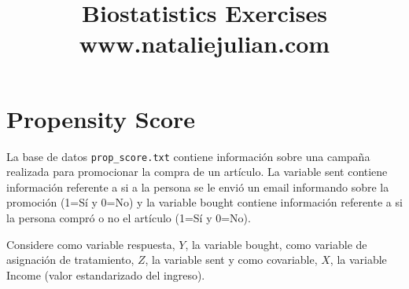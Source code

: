 \documentclass[11pt,onside]{article}
\title{\blue Biostatistics Exercises \\
\blueb www.nataliejulian.com}
\author{}
\date{} %
\begin{document}


\maketitle

\section*{Propensity Score}

La base de datos \texttt{prop\_score.txt} contiene información sobre una campaña realizada para promocionar la compra de un artículo. La variable sent contiene información referente a si a la persona se le envió un email informando sobre la promoción (1=Sí y 0=No) y la variable bought contiene información referente a si la persona compró o no el artículo (1=Sí y 0=No).

Considere como variable respuesta, $Y$, la variable bought, como variable de asignación de tratamiento, $Z$, la variable sent y como covariable, $X$, la variable Income (valor estandarizado del ingreso).
\end{document}
